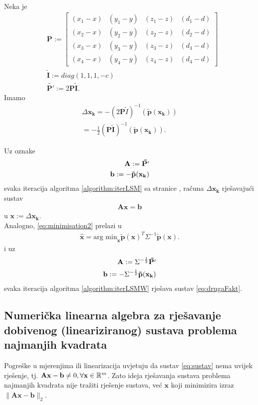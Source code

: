 \documentclass[a4paper,twoside,12pt]{memoir} %
\begin{document}
\\Neka je
\begin{align}
& \mathbf{P} := \begin{bmatrix}
(x_1-x) & (y_1-y) & (z_1-z) & (d_1-d) \\
(x_2-x) & (y_2-y) & (z_2-z) & (d_2-d) \\
(x_3-x) & (y_3-y) & (z_3-z) & (d_3-d) \\
(x_4-x) & (y_4-y) & (z_4-z) & (d_4-d) 
\end{bmatrix} \\
& \tilde{\mathbf{I}} := diag(1,1,1,-c) \\
& \mathbf{\tilde{\mathbf{P}'}}:= 2 \mathbf{P}\tilde{\mathbf{I}} .
\end{align}
Imamo 
\begin{align}
\Delta \mathbf{x_k} = -(2 \mathbf{P}\tilde{I} )^{-1}(\mathbf{\tilde{p}}(\mathbf{x_k}))
\\= -\frac{1}{2}(\mathbf{P}\tilde{\mathbf{I}} )^{-1}(\mathbf{\tilde{p}}(\mathbf{x_k})).
\end{align}

Uz oznake  
\begin{align}\label{eq:deffDrugaFakt}
\mathbf{A} := \mathbf{\tilde{P'}} \notag\\
\mathbf{b} := - \mathbf{\tilde{p}}(\mathbf{x_k})
\end{align}
svaka iteracija algoritma \ref{algorithm:iterLSM} sa stranice \pageref{algorithm:iterLSM},
računa $\Delta \mathbf{x_k}$ rješavajući sustav
\begin{align}\label{eq:drugaFakt}
\mathbf{A} \mathbf{x} = \mathbf{b}
\end{align}
u $\mathbf{x}:= \Delta \mathbf{x_k}$.
\vspace{0.5cm}
\\Analogno, \ref{eq:minimisation2} prelazi u 
\begin{align}\label{eq:minimisation4}
\hat{\mathbf{x}} = \text{arg min}_\mathbf{x} \mathbf{\tilde{p}}(\mathbf{x})^T \Sigma ^{-1}\mathbf{\tilde{p}}(\mathbf{x}).
\end{align}
i uz  
\begin{align}
\mathbf{A} := \Sigma^{-\frac{1}{2}}\mathbf{\tilde{P'}} \notag\\
\mathbf{b} := - \Sigma^{-\frac{1}{2}} \mathbf{\tilde{p}}(\mathbf{x_k}) \notag \\
\end{align}
svaka iteracija algoritma \ref{algorithm:iterLSMW} rješava sustav \ref{eq:drugaFakt}.

\subsection{Numerička linearna algebra za rješavanje dobivenog (lineariziranog) sustava problema najmanjih kvadrata}
Pogreške u mjerenjima ili linearizacija uvjetuju da sustav \ref{eq:sustav} nema uvijek rješenje, tj. 
$\mathbf{A}\mathbf{x} - \mathbf{b} \not = 0, \forall \mathbf{x} \in \mathbb{R}^m$. 
Zato ideja rješavanja sustava problema najmanjih kvadrata nije tražiti rješenje sustava, već $\mathbf{x}$ koji minimizira izraz $\|\mathbf{A}\mathbf{x} - \mathbf{b}\|_2$. \\
\end{document}
